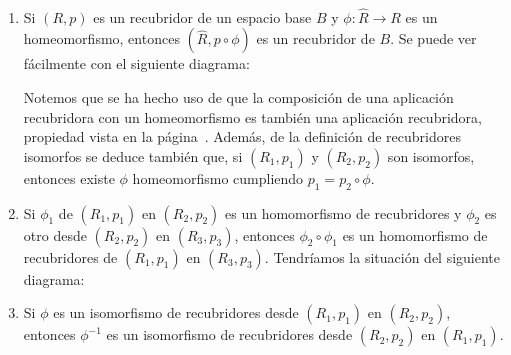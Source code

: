\begin{observacion}\
    \begin{enumerate}
        \item Si $(R,p)$ es un recubridor de un espacio base $B$ y $\phi:\hat{R}\to R$ es un homeomorfismo, entonces $(\hat{R}, p\circ \phi)$ es un recubridor de $B$. Se puede ver fácilmente con el siguiente diagrama:
        \begin{center}
        \end{center}
        
        Notemos que se ha hecho uso de que la composición de una aplicación recubridora con un homeomorfismo es también una aplicación recubridora, propiedad vista en la página~\pageref{propiedades:recubridora}. Además, de la definición de recubridores isomorfos se deduce también que, si $(R_1,p_1)$ y $(R_2,p_2)$ son isomorfos, entonces existe $\phi$ homeomorfismo cumpliendo $p_1=p_2\circ \phi$.

        \item Si $\phi_1$ de $(R_1,p_1)$ en $(R_2,p_2)$ es un homomorfismo de recubridores y $\phi_2$ es otro desde $(R_2,p_2)$ en $(R_3,p_3)$, entonces $\phi_2\circ \phi_1$ es un homomorfismo de recubridores de $(R_1,p_1)$ en $(R_3, p_3)$. Tendríamos la situación del siguiente diagrama:
        \begin{center}
        \end{center}

        \item Si $\phi$ es un isomorfismo de recubridores desde $(R_1,p_1)$ en $(R_2,p_2)$, entonces $\phi^{-1}$ es un isomorfismo de recubridores desde $(R_2,p_2)$ en $(R_1,p_1)$.
        \begin{center}
        \end{center}


\end{enumerate}
\end{observacion}
